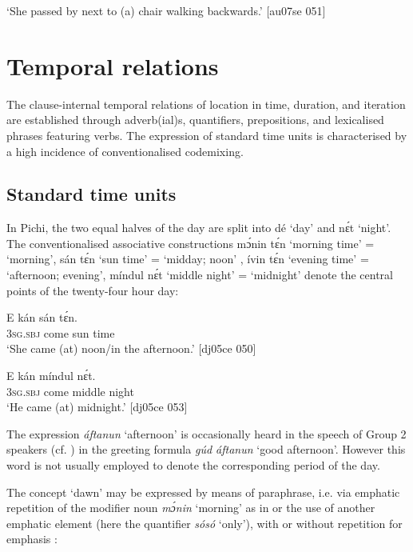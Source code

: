 \glt ‘She passed by next to (a) chair walking backwards.’ [au07se 051]
\z

\section{Temporal relations}\label{sec:8.2}

The clause-internal temporal relations of location in time, duration, and iteration are established through adverb(ial)s, quantifiers, prepositions, and lexicalised phrases featuring verbs. The expression of standard time units is characterised by a high incidence of conventionalised codemixing.

\subsection{Standard time units}

In Pichi, the two equal halves of the day are split into dé ‘day’ and nɛ́t ‘night’. The conventionalised associative constructions mɔ́nin tɛ́n ‘morning time’ = ‘morning’, sán tɛ́n ‘sun time’ = ‘midday; noon’ , ívin tɛ́n ‘evening time’ = ‘afternoon; evening’, míndul nɛ́t ‘middle night’ = ‘midnight’  denote the central points of the twenty-four hour day:{\fff}


\ea%
    \label{ex:key:995}
    \gll E    kán    sán  tɛ́n.\\
\textsc{3sg.sbj}  come  sun  time\\

\glt ‘She came (at) noon/in the afternoon.’ [dj05ce 050]
\z


\ea%
    \label{ex:key:996}
    \gll E    kán    míndul  nɛ́t.\\
\textsc{3sg.sbj}  come  middle  night\\

\glt ‘He came (at) midnight.’ [dj05ce 053]
\z

The expression \textit{áftanun} ‘afternoon’ is occasionally heard in the speech of Group 2 speakers (cf. ) in the greeting formula \textit{gúd áftanun} ‘good afternoon’. However this word is not usually employed to denote the corresponding period of the day.


The concept ‘dawn’ may be expressed by means of paraphrase, i.e. via emphatic repetition of the modifier noun \textit{mɔ́nin} ‘morning’ as in  or the use of another emphatic element (here the quantifier \textit{sósó} ‘only’), with or without repetition for emphasis :



